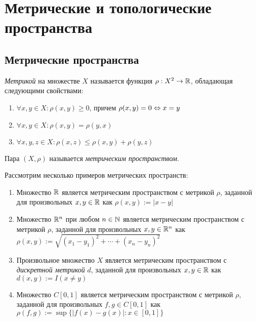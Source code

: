 \section{Метрические и топологические пространства}

\subsection{Метрические пространства}

\begin{definition}
	\textit{Метрикой} на множестве $X$ называется функция $\rho : X^2 \to \mathbb{R}$, обладающая следующими свойствами:
	\begin{enumerate}
		\item $\forall x, y \in X: \rho(x, y) \ge 0$, причем $\rho(x, y) = 0 \Leftrightarrow x = y$
		\item $\forall x, y \in X: \rho(x, y) = \rho(y, x)$
		\item $\forall x, y, z \in X: \rho(x, z) \le \rho(x, y) + \rho(y, z)$
	\end{enumerate}
	
	Пара $(X, \rho)$ называется \textit{метрическим пространством}.
\end{definition}

\begin{example}
	Рассмотрим несколько примеров метрических пространств:
	\begin{enumerate}
		\item Множество $\mathbb{R}$ является метрическим пространством с метрикой $\rho$, заданной для произвольных $x, y \in \mathbb{R}$ как $\rho(x, y) := |x - y|$
		
		\item Множество $\mathbb{R}^n$ при любом $n \in \mathbb{N}$ является метрическим пространством с метрикой $\rho$, заданной для произвольных $x, y \in \mathbb{R}^n$ как $\rho(x, y) := \sqrt{(x_1 - y_1)^2 + \dotsb + (x_n - y_n)^2}$
		
		\item Произвольное множество $X$ является метрическим пространством с \textit{дискретной метрикой} $d$, заданной для произвольных $x, y \in \mathbb{R}$ как $d(x, y) := I(x \ne y)$
		
		\item Множество $C[0, 1]$ является метрическим пространством с метрикой $\rho$, заданной для произвольных $f, g \in C[0, 1]$ как $\rho(f, g) := \sup\{|f(x) - g(x)| : x \in [0, 1]\}$
	\end{enumerate}
\end{example}

